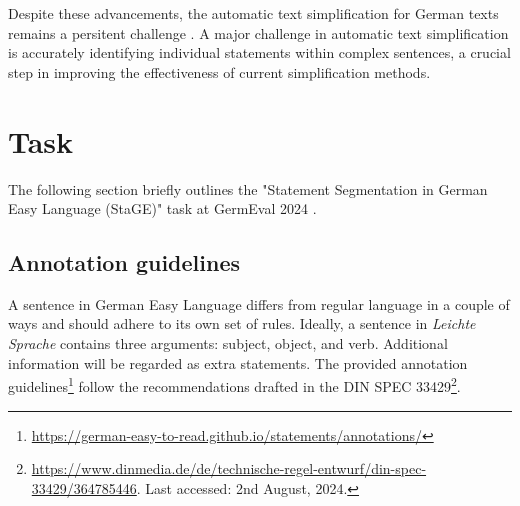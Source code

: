 \documentclass[11pt]{article}
\begin{document}
Despite these advancements, the automatic text simplification for German texts remains a persitent challenge \citep{schomacker-etal-2023-exploring}. A major challenge in automatic text simplification is accurately identifying individual statements within complex sentences, a crucial step in improving the effectiveness of current simplification methods.


\section{Task}

The following section briefly outlines the "Statement Segmentation in German Easy Language (StaGE)" task at GermEval 2024 \citep{germeval-2024-stage}.

  
\subsection{Annotation guidelines}

A sentence in German Easy Language differs from regular language in a couple of ways and should adhere to its own set of rules. Ideally, a sentence in \textit{Leichte Sprache} contains three arguments: subject, object, and verb. Additional information will be regarded as extra statements. The provided annotation guidelines\footnote{\url{https://german-easy-to-read.github.io/statements/annotations/}} follow the recommendations drafted in the DIN SPEC 33429\footnote{\url{https://www.dinmedia.de/de/technische-regel-entwurf/din-spec-33429/364785446}. Last accessed: 2nd August, 2024.}.
\end{document}

